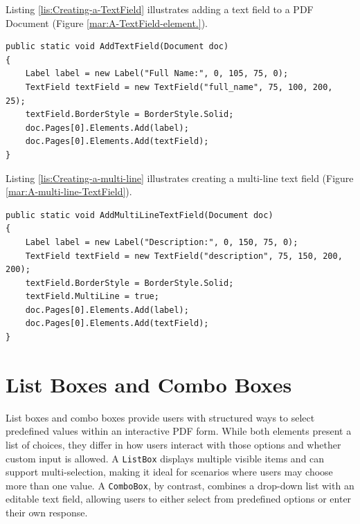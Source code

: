 \documentclass[american]{tufte-book}
\numberwithin{equation}{section}
\numberwithin{figure}{section}
\begin{document}
{Listing \ref{lis:Creating-a-TextField} illustrates adding a text
field to a PDF Document (Figure \ref{mar:A-TextField-element.}).


\bgroup{}
\begin{lstlisting}[caption={Creating a TextField element.},label={lis:Creating-a-TextField},basicstyle={\footnotesize\ttfamily},breaklines=true]
public static void AddTextField(Document doc)
{
    Label label = new Label("Full Name:", 0, 105, 75, 0);
    TextField textField = new TextField("full_name", 75, 100, 200, 25);
    textField.BorderStyle = BorderStyle.Solid;
    doc.Pages[0].Elements.Add(label);
    doc.Pages[0].Elements.Add(textField);
}
\end{lstlisting}
\leavevmode\egroup

Listing \ref{lis:Creating-a-multi-line} illustrates creating a multi-line
text field (Figure \ref{mar:A-multi-line-TextField}).

\bgroup{}
\begin{lstlisting}[caption={Creating a multi-line TextField element.},label={lis:Creating-a-multi-line},basicstyle={\footnotesize\ttfamily},breaklines=true]
public static void AddMultiLineTextField(Document doc)
{
    Label label = new Label("Description:", 0, 150, 75, 0);
    TextField textField = new TextField("description", 75, 150, 200, 200);
    textField.BorderStyle = BorderStyle.Solid;
    textField.MultiLine = true;
    doc.Pages[0].Elements.Add(label);
    doc.Pages[0].Elements.Add(textField);
}
\end{lstlisting}
\leavevmode\egroup


\section{List Boxes and Combo Boxes}
List boxes and combo boxes provide users with structured ways to select predefined values within an interactive PDF form. While both elements present a list of choices, they differ in how users interact with those options and whether custom input is allowed. A \texttt{ListBox} displays multiple visible items and can support multi-selection, making it ideal for scenarios where users may choose more than one value. A \texttt{ComboBox}, by contrast, combines a drop-down list with an editable text field, allowing users to either select from predefined options or enter their own response.

}
\end{document}
